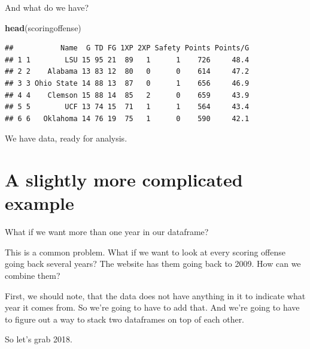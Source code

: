 \documentclass[]{book}
\newenvironment{Shaded}{\begin{snugshade}}{\end{snugshade}}
\newcommand{\DataTypeTok}[1]{\textcolor[rgb]{0.13,0.29,0.53}{#1}}
\newcommand{\DecValTok}[1]{\textcolor[rgb]{0.00,0.00,0.81}{#1}}
\newcommand{\KeywordTok}[1]{\textcolor[rgb]{0.13,0.29,0.53}{\textbf{#1}}}
\newcommand{\NormalTok}[1]{#1}
\newcommand{\OperatorTok}[1]{\textcolor[rgb]{0.81,0.36,0.00}{\textbf{#1}}}
\newcommand{\StringTok}[1]{\textcolor[rgb]{0.31,0.60,0.02}{#1}}
\begin{document}
And what do we have?

\begin{Shaded}
\begin{Highlighting}[]
\KeywordTok{head}\NormalTok{(scoringoffense)}
\end{Highlighting}
\end{Shaded}

\begin{verbatim}
##           Name  G TD FG 1XP 2XP Safety Points Points/G
## 1 1        LSU 15 95 21  89   1      1    726     48.4
## 2 2    Alabama 13 83 12  80   0      0    614     47.2
## 3 3 Ohio State 14 88 13  87   0      1    656     46.9
## 4 4    Clemson 15 88 14  85   2      0    659     43.9
## 5 5        UCF 13 74 15  71   1      1    564     43.4
## 6 6   Oklahoma 14 76 19  75   1      0    590     42.1
\end{verbatim}

We have data, ready for analysis.

\hypertarget{a-slightly-more-complicated-example}{%
\section{A slightly more complicated example}\label{a-slightly-more-complicated-example}}

What if we want more than one year in our dataframe?

This is a common problem. What if we want to look at every scoring offense going back several years? The website has them going back to 2009. How can we combine them?

First, we should note, that the data does not have anything in it to indicate what year it comes from. So we're going to have to add that. And we're going to have to figure out a way to stack two dataframes on top of each other.

So let's grab 2018.

\begin{Shaded}
\end{Shaded}
\end{document}
